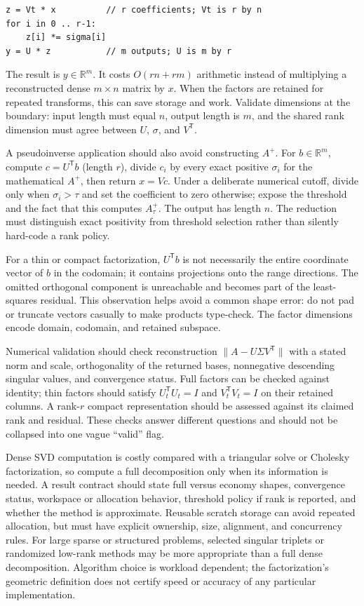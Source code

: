 \begin{verbatim}
z = Vt * x          // r coefficients; Vt is r by n
for i in 0 .. r-1:
    z[i] *= sigma[i]
y = U * z           // m outputs; U is m by r
\end{verbatim}

The result is \(y\in\mathbb R^m\). It costs \(O(rn+rm)\) arithmetic instead of multiplying a reconstructed dense \(m\times n\) matrix by \(x\). When the factors are retained for repeated transforms, this can save storage and work. Validate dimensions at the boundary: input length must equal \(n\), output length is \(m\), and the shared rank dimension must agree between \(U\), \(\sigma\), and \(V^\mathsf T\).

A pseudoinverse application should also avoid constructing \(A^+\). For \(b\in\mathbb R^m\), compute \(c=U^\mathsf T b\) (length \(r\)), divide \(c_i\) by every exact positive \(\sigma_i\) for the mathematical \(A^+\), then return \(x=Vc\). Under a deliberate numerical cutoff, divide only when \(\sigma_i>\tau\) and set the coefficient to zero otherwise; expose the threshold and the fact that this computes \(A_\tau^+\). The output has length \(n\). The reduction must distinguish exact positivity from threshold selection rather than silently hard-code a rank policy.

For a thin or compact factorization, \(U^\mathsf T b\) is not necessarily the entire coordinate vector of \(b\) in the codomain; it contains projections onto the range directions. The omitted orthogonal component is unreachable and becomes part of the least-squares residual. This observation helps avoid a common shape error: do not pad or truncate vectors casually to make products type-check. The factor dimensions encode domain, codomain, and retained subspace.

Numerical validation should check reconstruction \(\|A-U\Sigma V^\mathsf T\|\) with a stated norm and scale, orthogonality of the returned bases, nonnegative descending singular values, and convergence status. Full factors can be checked against identity; thin factors should satisfy \(U_t^\mathsf T U_t=I\) and \(V_t^\mathsf T V_t=I\) on their retained columns. A rank-\(r\) compact representation should be assessed against its claimed rank and residual. These checks answer different questions and should not be collapsed into one vague ``valid'' flag.

Dense SVD computation is costly compared with a triangular solve or Cholesky factorization, so compute a full decomposition only when its information is needed. A result contract should state full versus economy shapes, convergence status, workspace or allocation behavior, threshold policy if rank is reported, and whether the method is approximate. Reusable scratch storage can avoid repeated allocation, but must have explicit ownership, size, alignment, and concurrency rules. For large sparse or structured problems, selected singular triplets or randomized low-rank methods may be more appropriate than a full dense decomposition. Algorithm choice is workload dependent; the factorization's geometric definition does not certify speed or accuracy of any particular implementation.

